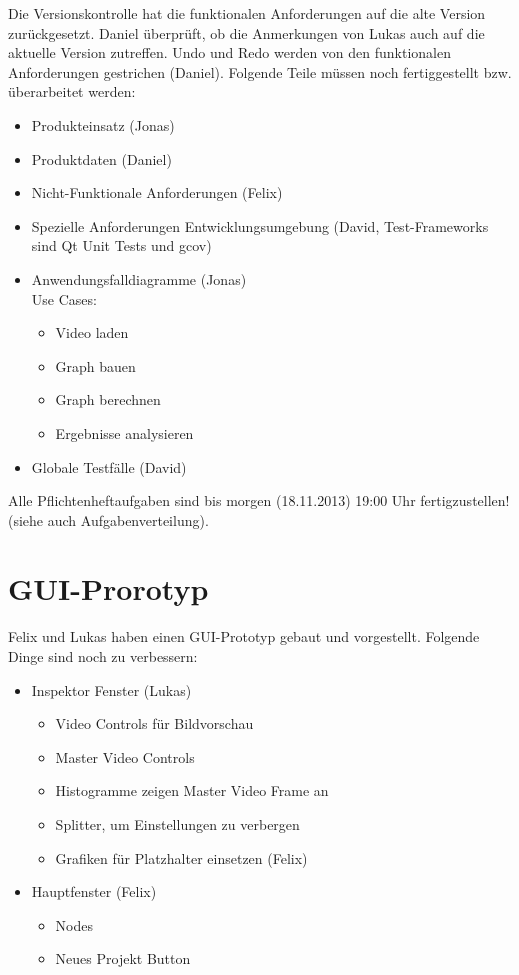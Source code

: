 \documentclass[a4paper]{article}
\begin{document}
Die Versionskontrolle hat die funktionalen Anforderungen auf die alte Version zurückgesetzt. Daniel überprüft, ob die Anmerkungen von Lukas auch auf die aktuelle Version zutreffen. Undo und Redo werden von den funktionalen Anforderungen gestrichen (Daniel). Folgende Teile müssen noch fertiggestellt bzw. überarbeitet werden:
\begin{itemize}
	\item Produkteinsatz (Jonas)
	\item Produktdaten (Daniel)
	\item Nicht-Funktionale Anforderungen (Felix)
	\item Spezielle Anforderungen Entwicklungsumgebung (David, Test-Frameworks sind Qt Unit Tests und gcov)
	\item Anwendungsfalldiagramme (Jonas) \\ Use Cases:
	\begin{itemize}
		\item Video laden
		\item Graph bauen
		\item Graph berechnen
		\item Ergebnisse analysieren
	\end{itemize}
	\item Globale Testfälle (David)
\end{itemize}

Alle Pflichtenheftaufgaben sind bis morgen (18.11.2013) 19:00 Uhr fertigzustellen! (siehe auch Aufgabenverteilung).

\section{GUI-Prorotyp}

Felix und Lukas haben einen GUI-Prototyp gebaut und vorgestellt. Folgende Dinge sind noch zu verbessern:
\begin{itemize}
	\item Inspektor Fenster (Lukas)
	\begin{itemize}
		\item Video Controls für Bildvorschau
		\item Master Video Controls
		\item Histogramme zeigen Master Video Frame an
		\item Splitter, um Einstellungen zu verbergen
		\item Grafiken für Platzhalter einsetzen (Felix)
	\end{itemize}
	
	\item Hauptfenster (Felix)
	\begin{itemize}
		\item Nodes
		\item Neues Projekt Button
	\end{itemize}
\end{itemize}
\end{document}
